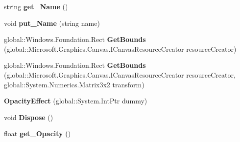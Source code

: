 \begin{DoxyCompactItemize}
\item 
\mbox{\label{class_microsoft_1_1_graphics_1_1_canvas_1_1_effects_1_1_opacity_effect_a76362be9f196950b8f3f89b7266f0e1c}} 
string {\bfseries get\+\_\+\+Name} ()
\item 
\mbox{\label{class_microsoft_1_1_graphics_1_1_canvas_1_1_effects_1_1_opacity_effect_a56f86cc24fb695fa3d599c2da53fb6d5}} 
void {\bfseries put\+\_\+\+Name} (string name)
\item 
\mbox{\label{class_microsoft_1_1_graphics_1_1_canvas_1_1_effects_1_1_opacity_effect_a8bf0901a94b4839c766e269bfa8a8549}} 
global\+::\+Windows.\+Foundation.\+Rect {\bfseries Get\+Bounds} (global\+::\+Microsoft.\+Graphics.\+Canvas.\+I\+Canvas\+Resource\+Creator resource\+Creator)
\item 
\mbox{\label{class_microsoft_1_1_graphics_1_1_canvas_1_1_effects_1_1_opacity_effect_ae3afb2721cc2938d2730bfcfdab779d2}} 
global\+::\+Windows.\+Foundation.\+Rect {\bfseries Get\+Bounds} (global\+::\+Microsoft.\+Graphics.\+Canvas.\+I\+Canvas\+Resource\+Creator resource\+Creator, global\+::\+System.\+Numerics.\+Matrix3x2 transform)
\item 
\mbox{\label{class_microsoft_1_1_graphics_1_1_canvas_1_1_effects_1_1_opacity_effect_a637fb4e2ccc14281dc718c4623e0343c}} 
{\bfseries Opacity\+Effect} (global\+::\+System.\+Int\+Ptr dummy)
\item 
\mbox{\label{class_microsoft_1_1_graphics_1_1_canvas_1_1_effects_1_1_opacity_effect_a1246fe8a73f548e85044aa9a5849aabc}} 
void {\bfseries Dispose} ()
\item 
\mbox{\label{class_microsoft_1_1_graphics_1_1_canvas_1_1_effects_1_1_opacity_effect_a3a7a9f455303d589535bffc1fbff1ed7}} 
float {\bfseries get\+\_\+\+Opacity} ()
\item 

\end{DoxyCompactItemize}
